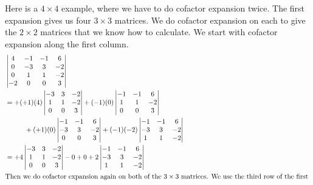 \documentclass[fleqn,letterpaper]{report}
\begin{document}
\begin{example}
Here is a $4 \times 4$ example, where we have to do cofactor
expansion twice. The first expansion gives us four $3 \times
3$ matrices. We do cofactor expansion on each to give the $2
\times 2$ matrices that we know how to calculate. We start
with cofactor expansion along the first column.
\begin{align*}
& \left| 
\begin{matrix}
4 & -1 & -1 & 6 \\
0 & -3 & 3 & -2 \\
0 & 1 & 1 & -2 \\
-2 & 0 & 0 & 3 
\end{matrix} 
\right| \\
& = 
+ (+1) (4)
\left| 
\begin{matrix}
-3 & 3 & -2 \\
1 & 1 & -2 \\
0 & 0 & 3 
\end{matrix} 
\right|
+ (-1) (0)
\left| 
\begin{matrix}
-1 & -1 & 6 \\ 1 & 1 & -2 \\ 0 & 0 & 3 
\end{matrix} 
\right| \\
& \hspace{1cm} + (+1) (0)
\left| 
\begin{matrix}
-1 & - 1 & 6 \\ -3 & 3 & -2 \\ 0 & 0 & 3
\end{matrix} 
\right|
+ (-1) (-2)
\left| 
\begin{matrix}
-1 & -1 & 6 \\
-3 & 3 & -2 \\
1 & 1 & -2 
\end{matrix} 
\right| \\
& = 
+ 4
\left| 
\begin{matrix}
-3 & 3 & -2 \\
1 & 1 & -2 \\
0 & 0 & 3 
\end{matrix} 
\right|
- 0
+ 0
+ 2
\left| 
\begin{matrix}
-1 & -1 & 6 \\
-3 & 3 & -2 \\
1 & 1 & -2 
\end{matrix} 
\right| \\
\intertext{Then we do cofactor expansion again on both of the
$3 \times 3$ matrices. We use the third row of the first
}
\end{align*}
\end{example}
\end{document}

